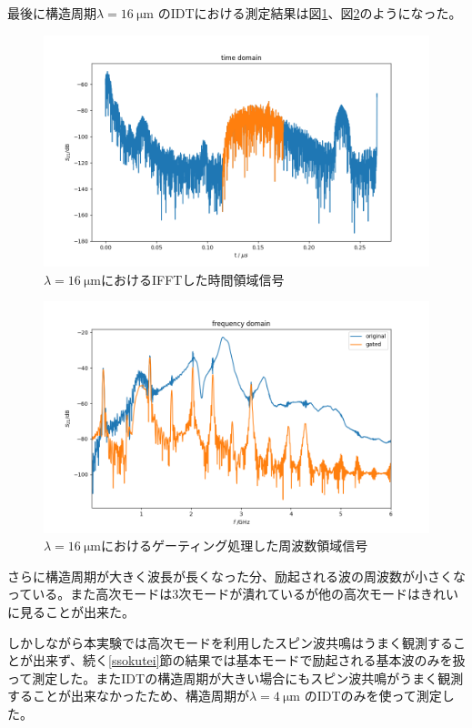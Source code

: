 \documentclass[dvipdfmx,11pt]{jsreport}
\numberwithin{equation}{chapter}
\numberwithin{table}{chapter}
\begin{document}
最後に構造周期$\lambda=\SI{16}{\micro \metre}$ のIDTにおける測定結果は図\ref{fig:figdata-idt17-4time-png}、図\ref{fig:figdata-idt17-4-png}のようになった。

\begin{figure}[H]
	\centering
	\includegraphics[width=\textwidth]{figdata/idt17-4time.png}
	\caption{$\lambda=\SI{16}{\micro \metre}$におけるIFFTした時間領域信号}
	\label{fig:figdata-idt17-4time-png}
\end{figure}
\begin{figure}[H]
	\centering
	\includegraphics[width=\textwidth]{figdata/idt17-4.png}
	\caption{$\lambda=\SI{16}{\micro \metre}$におけるゲーティング処理した周波数領域信号}
	\label{fig:figdata-idt17-4-png}
\end{figure}
さらに構造周期が大きく波長が長くなった分、励起される波の周波数が小さくなっている。また高次モードは3次モードが潰れているが他の高次モードはきれいに見ることが出来た。

しかしながら本実験では高次モードを利用したスピン波共鳴はうまく観測することが出来ず、続く\ref{ssokutei}節の結果では基本モードで励起される基本波のみを扱って測定した。またIDTの構造周期が大きい場合にもスピン波共鳴がうまく観測することが出来なかったため、構造周期が$\lambda=\SI{4}{\micro \metre}$ のIDTのみを使って測定した。
\end{document}
